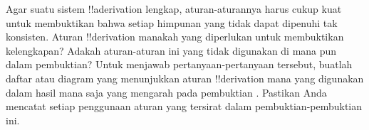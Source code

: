 \documentclass[../../../include/open-logic-section]{subfiles}
\begin{document}
\begin{prob}
Agar suatu sistem !!a{derivation} lengkap, aturan-aturannya harus cukup
kuat untuk membuktikan bahwa setiap himpunan yang tidak dapat dipenuhi
tak konsisten. Aturan !!{derivation} manakah yang diperlukan untuk
membuktikan kelengkapan? Adakah aturan-aturan ini yang tidak digunakan
di mana pun dalam pembuktian? Untuk menjawab pertanyaan-pertanyaan
tersebut, buatlah daftar atau diagram yang menunjukkan aturan
!!{derivation} mana yang digunakan dalam hasil mana saja yang mengarah pada
pembuktian . Pastikan Anda mencatat
setiap penggunaan aturan yang tersirat dalam pembuktian-pembuktian ini.
\end{prob}
\tagendprob
\end{document}
